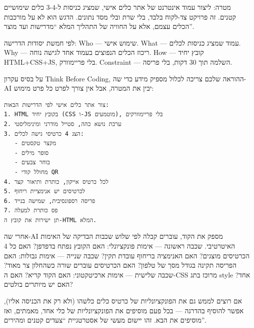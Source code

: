 



מטרה: ליצור עמוד אינטרנט של אתר כלים אישי, שמציג כניסות ל-3-4 כלים שימושיים קטנים. זה פרויקט צד-לקוח בלבד, בלי שרת ובלי מסד נתונים. הדגש הוא לא על מורכבות הכלים עצמם, אלא על החוויה של התהליך המלא “מדרישות ועד מוצר”.

לפי חמשת יסודות הדרישה: Who — שימוש אישי. What — עמוד שמציג כניסות לכלים. Why — ריכוז הכלים הנפוצים בעמוד אחד לגישה נוחה. How — קובץ יחיד HTML+CSS+JS, בלי פריימוורק. Constraint — השלמה תוך 30 דקות, בלי פריסה.


על בסיס עקרון Think Before Coding, ההוראה שלכם צריכה לכלול מספיק מידע כדי שה-AI יבין את המטרה, אבל אין צורך לפרט כל פרט מימוש:

\begin{lstlisting}
צור אתר כלים אישי לפי הדרישות הבאות:
1. HTML בקובץ יחיד (CSS ו-JS מוטמעים), בלי פריימוורקים
2. ערכת נושא כהה, סטייל מודרני ומינימליסטי
3. הצג 4 כרטיסי גישה לכלים:
   - מקצר טקסטים
   - סופר מילים
   - בוחר צבעים
   - מחולל קודי QR
4. לכל כרטיס אייקון, כותרת ותיאור קצר
5. לכרטיסים יש אנימציית ריחוף
6. פריסה רספונסיבית, שמישה בנייד
7. פס כותרת למעלה
תן ישירות את קובץ ה-HTML המלא.
\end{lstlisting}


אחרי שה-AI מספק את הקוד, עוברים קבלה לפי שלוש שכבות הבדיקה של האימות האיטרטיבי. שכבה ראשונה — אימות פונקציונלי: האם הקובץ נפתח בדפדפן? האם כל 4 הכרטיסים מוצגים? האם האנימציה בריחוף עובדת תקין? שכבה שנייה — אימות גבולות: האם הפריסה תקינה בגודל מסך של טלפון? האם הכרטיסים עוברים שורה כשהחלון צר מאוד? שכבה שלישית — אימות ארכיטקטוני: האם הקוד קריא? האם ה-CSS מרוכז בתג style אחד? האם יש מיותרים בולטים?

אם רוצים לממש גם את הפונקציונליות של כרטיס כלים כלשהו (ולא רק את הכניסה אליו), אפשר להוסיף בהדרגה — בכל פעם מוסיפים את הפונקציונליות של כלי אחד, מאמתים, ואז מוסיפים את הבא. זהו יישום מעשי של אסטרטגיית “צעדים קטנים ומהירים”.

